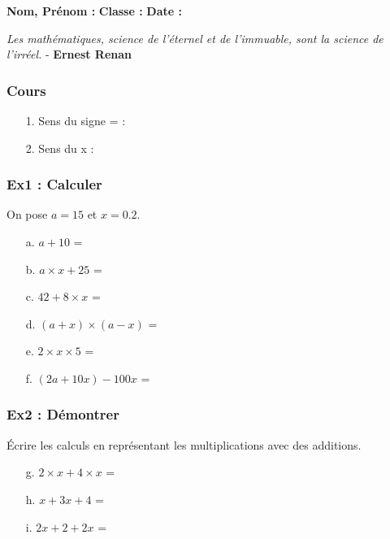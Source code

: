 



\textbf{Nom, Prénom :} \hspace{8cm} \textbf{Classe :} \hspace{3cm} \textbf{Date :}\\

\begin{center}
  \textit{Les mathématiques, science de l’éternel et de l’immuable, sont la science de l’irréel.}  - \textbf{Ernest Renan}
\end{center}

\subsubsection*{Cours}

\begin{enumerate}
	\item[1.] Sens du signe = : \dotfill 
	\item[2.] Sens du x :  \dotfill  
\end{enumerate}

\subsubsection*{Ex1 : Calculer}

On pose $a = 15$ et $x = 0.2$.

\begin{enumerate}
  \item[a.] $a + 10$ = \dotfill 
  \item[b.] $a \times x + 25$ = \dotfill 
  \item[c.] $42 + 8 \times x$ = \dotfill 
  \item[d.] $(a + x)\times (a - x)$ = \dotfill 
  \item[e.] $2 \times x \times 5$ = \dotfill 
  \item[f.] $(2a + 10x) - 100x$ = \dotfill 
\end{enumerate}

\subsubsection*{Ex2 : Démontrer}

Écrire les calculs en représentant les multiplications avec des additions.

\begin{enumerate}
  \item[g.] $2 \times x + 4 \times x$ = \dotfill 
  \item[h.] $x + 3x + 4$ = \dotfill 
  \item[i.] $2x + 2 +  2x$ = \dotfill 
\end{enumerate}


